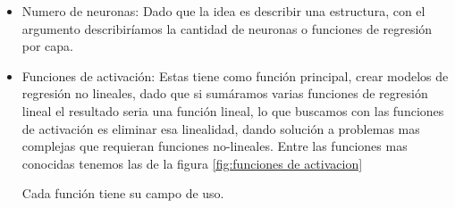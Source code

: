 \begin{itemize}
    \item Numero de neuronas: Dado que la idea es describir una estructura, con
        el argumento describiríamos la cantidad de neuronas o funciones de
        regresión por capa. 
    \item Funciones de activación: Estas tiene como función principal, crear
        modelos de regresión no lineales, dado que si sumáramos varias
        funciones de regresión lineal el resultado seria una función lineal, lo
        que buscamos con las funciones de activación es eliminar esa
        linealidad, dando solución a problemas mas complejas que requieran
        funciones no-lineales. Entre las funciones mas conocidas tenemos las de
        la figura \ref{fig:funciones de activacion}

        Cada función tiene su campo de uso. 


\end{itemize}
